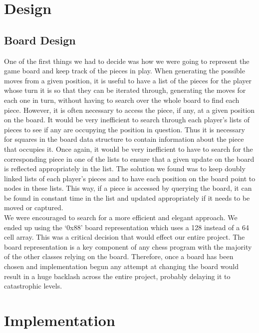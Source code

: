 \documentclass{l3proj}
\begin{document}
\chapter{Design}
\label{design}

\section{Board Design}
	One of the first things we had to decide was how we were going to represent the game board and keep track of the pieces in play. When generating the possible moves from a given position, it is useful to have a list of the pieces for the player whose turn it is so that they can be iterated through, generating the moves for each one in turn, without having to search over the whole board to find each piece. However, it is often necessary to access the piece, if any, at a given position on the board. It would be very inefficient to search through each player’s lists of pieces to see if any are occupying the position in question. Thus it is necessary for squares in the board data structure to contain information about the piece that occupies it. Once again, it would be very inefficient to have to search for the corresponding piece in one of the lists to ensure that a given update on the board is reflected appropriately in the list. The solution we found was to keep doubly linked lists of each player’s pieces and to have each position on the board point to nodes in these lists. This way, if a piece is accessed by querying the board, it can be found in constant time in the list and updated appropriately if it needs to be moved or captured. \\

	We were encouraged to search for a more efficient and elegant approach. We ended up using the ‘0x88' board representation which uses a 128 instead of a 64 cell array. This was a critical decision that would effect our entire project. The board representation is a key component of any chess program with the majority of the other classes relying on the board. Therefore, once a board has been chosen and implementation begun any attempt at changing the board would result in a huge backlash across the entire project, probably delaying it to catastrophic levels.


\chapter{Implementation}
\label{impl}
\end{document}
